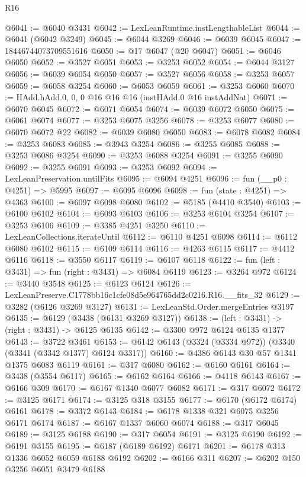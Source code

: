 \begin{lexlean}{R16}
\begin{coremodule}
@6041 := @6040 @3431
@6042 := LexLeanRuntime.instLengthableList
@6044 := @6041 (@6042 @3249)
@6045 := @6044 @3269
@6046 := @6039 @6045
@6047 := 18446744073709551616
@6050 := @17 @6047 (@20 @6047)
@6051 := @6046 @6050
@6052 := @3527 @6051
@6053 := @3253 @6052
@6054 := @6044 @3127
@6056 := @6039 @6054 @6050
@6057 := @3527 @6056
@6058 := @3253 @6057
@6059 := @6058 @3254
@6060 := @6053 @6059
@6061 := @3253 @6060
@6070 := HAdd.hAdd.{0, 0, 0} @16 @16 @16 (instHAdd.{0} @16 instAddNat)
@6071 := @6070 @6045
@6072 := @6071 @6054
@6074 := @6039 @6072 @6050
@6075 := @6061 @6074
@6077 := @3253 @6075 @3256
@6078 := @3253 @6077
@6080 := @6070 @6072 @22
@6082 := @6039 @6080 @6050
@6083 := @6078 @6082
@6084 := @3253 @6083
@6085 := @3943 @3254
@6086 := @3255 @6085
@6088 := @3253 @6086 @3254
@6090 := @3253 @6088 @3254
@6091 := @3255 @6090
@6092 := @3255 @6091
@6093 := @3253 @6092
@6094 := LexLeanPreservation.untilFits
@6095 := @6094 @4251
@6096 := fun (__p0 : @4251) => @5995
@6097 := @6095 @6096
@6098 := fun (state : @4251) => @4363
@6100 := @6097 @6098 @6080
@6102 := @5185 (@4410 @3540)
@6103 := @6100 @6102
@6104 := @6093 @6103
@6106 := @3253 @6104 @3254
@6107 := @3253 @6106
@6109 := @3385 @4251 @3250
@6110 := LexLeanCollections.iterateUntil
@6112 := @6110 @4251 @6098
@6114 := @6112 @6080 @6102
@6115 := @6109 @6114
@6116 := @4263 @6115
@6117 := @4412 @6116
@6118 := @3550 @6117
@6119 := @6107 @6118
@6122 := fun (left : @3431) => fun (right : @3431) => @6084 @6119
@6123 := @3264 @972
@6124 := @3440 @3548
@6125 := @6123 @6124
@6126 := LexLeanPreserve.C1778bb16c1cfe08d5e964765dd2c0216.R16.__fits_32
@6129 := @3282 (@6126 @3269 @3127)
@6131 := LexLeanStd.Order.mergeEntries @3197
@6135 := @6129 (@3438 (@6131 @3269 @3127))
@6138 := (left : @3431) -> (right : @3431) -> @6125 @6135
@6142 := @3300 @972 @6124 @6135 @1377
@6143 := @3722 @3461
@6153 := @6142 @6143 (@3324 (@3334 @972)) (@3340 (@3341 (@3342 @1377) @6124 @3317))
@6160 := @4386 @6143 @30 @57 @1341 @1375 @6083 @6119
@6161 := @317 @6080
@6162 := @6160 @6161
@6164 := @3438 (@3554 @6117)
@6165 := @6162 @6164
@6166 := @4118 @6143
@6167 := @6166 @309
@6170 := @6167 @1340 @6077 @6082
@6171 := @317 @6072
@6172 := @3125 @6171
@6174 := @3125 @318 @3155
@6177 := @6170 (@6172 @6174) @6161
@6178 := @3372 @6143
@6184 := @6178 @1338 @321 @6075 @3256 @6171 @6174
@6187 := @6167 @1337 @6060 @6074
@6188 := @317 @6045
@6189 := @3125 @6188
@6190 := @317 @6054
@6191 := @3125 @6190
@6192 := @6191 @3155
@6195 := @6187 (@6189 @6192) @6171
@6201 := @6178 @313 @1336 @6052 @6059 @6188 @6192
@6202 := @6166 @311
@6207 := @6202 @150 @3256 @6051 @3479 @6188

\end{coremodule}
\end{lexlean}
